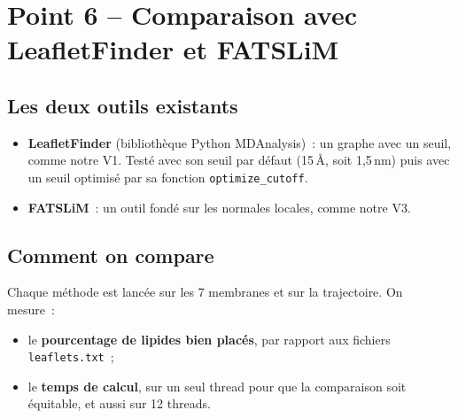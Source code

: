 \documentclass[11pt,a4paper]{article}
\newcommand{\f}[1]{\texttt{#1}}
\begin{document}
\section{Point 6 -- Comparaison avec LeafletFinder et FATSLiM}
\subsection{Les deux outils existants}
\begin{itemize}
\item \textbf{LeafletFinder} (bibliothèque Python MDAnalysis)~: un graphe avec un seuil, comme notre V1. Testé
avec son seuil par défaut (15\,Å, soit 1,5\,nm) puis avec un seuil optimisé par sa fonction
\f{optimize\_cutoff}.
\item \textbf{FATSLiM}~: un outil fondé sur les normales locales, comme notre V3.
\end{itemize}

\subsection{Comment on compare}
Chaque méthode est lancée sur les 7 membranes et sur la trajectoire. On mesure~:
\begin{itemize}
\item le \textbf{pourcentage de lipides bien placés}, par rapport aux fichiers \f{leaflets.txt}~;
\item le \textbf{temps de calcul}, sur un seul thread pour que la comparaison soit équitable, et aussi sur
12 threads.
\end{itemize}
\end{document}

